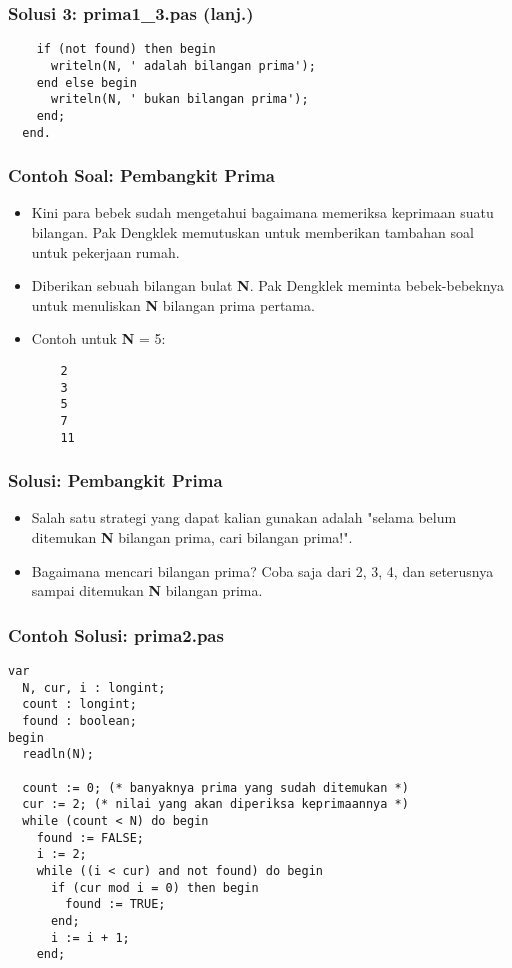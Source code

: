 \documentclass{beamer}
\begin{document}
\begin{frame}[fragile]
\frametitle{Solusi 3: prima1\_3.pas (lanj.)}
\begin{lstlisting}
    if (not found) then begin
      writeln(N, ' adalah bilangan prima');
    end else begin
      writeln(N, ' bukan bilangan prima');
    end;
  end.
\end{lstlisting}
\end{frame}

\begin{frame}[fragile]
\frametitle{Contoh Soal: Pembangkit Prima}
\begin{itemize}
  \item Kini para bebek sudah mengetahui bagaimana memeriksa keprimaan suatu bilangan. Pak Dengklek memutuskan untuk memberikan tambahan soal untuk pekerjaan rumah.
  \item Diberikan sebuah bilangan bulat \textbf{N}. Pak Dengklek meminta bebek-bebeknya untuk menuliskan \textbf{N} bilangan prima pertama.
  \item Contoh untuk \textbf{N} = 5:
  \begin{lstlisting}
    2
    3
    5
    7
    11
  \end{lstlisting}
\end{itemize}
\end{frame}

\begin{frame}
\frametitle{Solusi: Pembangkit Prima}
\begin{itemize}
  \item Salah satu strategi yang dapat kalian gunakan adalah "selama belum ditemukan \textbf{N} bilangan prima, cari bilangan prima!".
  \item Bagaimana mencari bilangan prima? Coba saja dari 2, 3, 4, dan seterusnya sampai ditemukan \textbf{N} bilangan prima.
\end{itemize}
\end{frame}

\begin{frame}[fragile]
\frametitle{Contoh Solusi: prima2.pas}
\begin{lstlisting}
var
  N, cur, i : longint;
  count : longint;
  found : boolean;
begin
  readln(N);

  count := 0; (* banyaknya prima yang sudah ditemukan *)
  cur := 2; (* nilai yang akan diperiksa keprimaannya *)
  while (count < N) do begin
    found := FALSE;
    i := 2;
    while ((i < cur) and not found) do begin
      if (cur mod i = 0) then begin
        found := TRUE;
      end;
      i := i + 1;
    end;
\end{lstlisting}
\end{frame}
\end{document}
